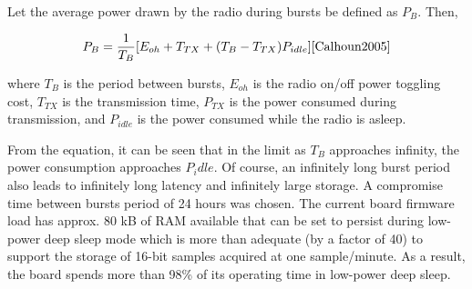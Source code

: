 Let the average power drawn by the radio during bursts be defined as $P_{B}$. Then, 

\begin{equation}
P_{B} = \frac{1}{T_{B}}[E_{oh} + T_{TX} +(T_{B}-T_{TX})P_{idle}]\cite{Calhoun2005}
\end{equation}

where $T_{B}$ is the period between bursts, $E_{oh}$ is the radio on/off power toggling cost, $T_{TX}$ is the transmission time, $P_{TX}$ is the power consumed during transmission, and $P_{idle}$ is the power consumed while the radio is asleep.

From the equation, it can be seen that in the limit as $T_B$ approaches infinity, the power consumption approaches $P_idle$. Of course, an infinitely long burst period also leads to infinitely long latency and infinitely large storage. A compromise time between bursts period of 24 hours was chosen. The current board firmware load has approx. 80 kB of RAM available that can be set to persist during low-power deep sleep mode which is more than adequate (by a factor of 40) to support the storage of 16-bit samples acquired at one sample/minute. As a result, the board spends more than 98\% of its operating time in low-power deep sleep. 
